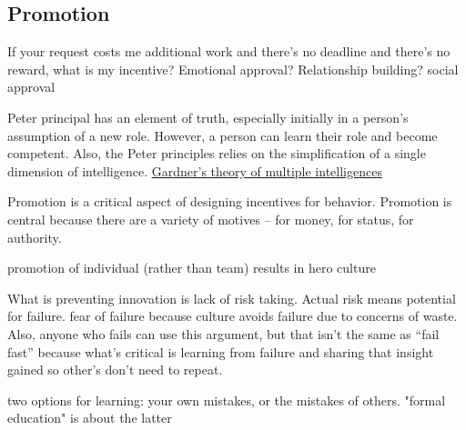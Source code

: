 \subsection{Promotion}


If your request costs me additional work and there's no deadline and there's no reward, what is my incentive?
Emotional approval? Relationship building? social approval


Peter principal \cite{1970_Peter} has an element of truth, especially initially in a person's assumption of a new role. However, a person can learn their role and become competent. Also, the Peter principles relies on the simplification of a single dimension of intelligence. 
\href{https://en.wikipedia.org/wiki/Theory_of_multiple_intelligences}{Gardner's theory of multiple intelligences}


Promotion is a critical aspect of designing incentives for behavior. Promotion is central because there are a variety of motives -- for money, for status, for authority. 

promotion of individual (rather than team) results in hero culture

What is preventing innovation is lack of risk taking. Actual risk means potential for failure. fear of failure because culture avoids failure due to concerns of waste. Also, anyone who fails can use this argument, but that isn't the same as ``fail fast'' because what's critical is learning from failure and sharing that insight gained so other's don't need to repeat. 

two options for learning: your own mistakes, or the mistakes of others. "formal education" is about the latter
